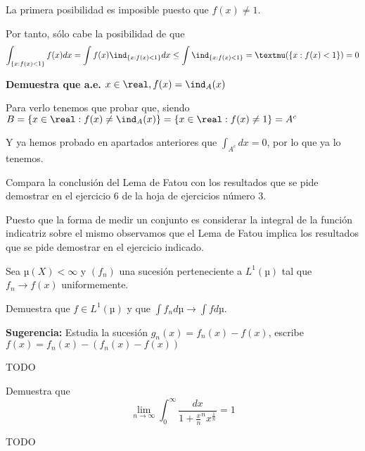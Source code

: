 \begin{problem}[15]
La primera posibilidad es imposible puesto que $f(x)\neq 1$.

Por tanto, sólo cabe la posibilidad de que
\[\int_{\{x: f(x)<1\}} f(x)dx = \int f(x) \ind_{\{x: f(x)<1\}}dx \leq \int \ind_{\{x: f(x)<1\}} = µ(\{x: f(x)<1\}) = 0\]

\textbf{Demuestra que a.e. $x\in\real, f(x)=\ind_A(x)$}

Para verlo tenemos que probar que, siendo $B=\{x\in\real: f(x) \neq \ind_A(x)\} = \{x\in\real: f(x) \neq 1\} = A^c$

Y ya hemos probado en apartados anteriores que $\int_{A^c}dx = 0$, por lo que ya lo tenemos.

\end{problem}


\begin{problem}[16]
Compara la conclusión del Lema de Fatou con los resultados que se pide demostrar en el ejercicio 6 de la hoja de ejercicios número 3.

\solution

Puesto que la forma de medir un conjunto es considerar la integral de la función indicatriz sobre el mismo observamos que el Lema de Fatou implica los resultados que se pide demostrar en el ejercicio indicado.
\end{problem}

\begin{problem}[17]
Sea $µ(X)<\infty$ y $(f_n)$ una sucesión perteneciente a $L^1(µ)$ tal que $f_n\rightarrow f(x)$ uniformemente.

Demuestra que $f\in L^1(µ)$ y que $\int f_n dµ \rightarrow \int f dµ$.

\textbf{Sugerencia:} Estudia la sucesión $g_n(x)=f_n(x)-f(x)$, escribe $f(x)=f_n(x)-(f_n(x)-f(x))$

\solution

TODO

\end{problem}
\begin{problem}[18]
Demuestra que
\[\lim_{n\to\infty}\int_0^{\infty}\frac{dx}{1+\frac{x}{n}^n x^{\frac{1}{n}}} = 1\]

\solution
TODO
\end{problem}



